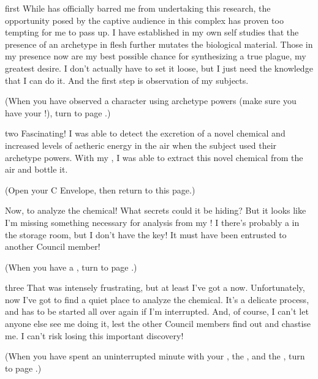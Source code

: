 \documentclass[notebook]{Silversiders} %
\begin{document}
\startnotebook{\nPlagueResearch{}}

\begin{page}{first}
While \cDeath{} has officially barred me from undertaking this research, the opportunity posed by the captive audience in this complex has proven too tempting for me to pass up. I have established in my own self studies that the presence of an archetype in flesh further mutates the biological material. Those in my presence now are my best possible chance for synthesizing a true plague, my greatest desire. I don't actually have to set it loose, but I just need the knowledge that I can do it. And the first step is observation of my subjects.

(When you have observed a character using archetype powers (make sure you have your \iBioKit{}!), turn to page .)
\end{page}

\begin{page}{two}
Fascinating! I was able to detect the excretion of a novel chemical and increased levels of aetheric energy in the air when the subject used their archetype powers. With my \iBioKit{}, I was able to extract this novel chemical from the air and bottle it.

(Open your C Envelope, then return to this page.)

Now, to analyze the chemical! What secrets could it be hiding? But it looks like I'm missing something necessary for analysis from my \iBioKit{}! I there's probably a \iDiffusionMagnifier{} in the storage room, but I don't have the key! It must have been entrusted to another Council member!

(When you have a \iDiffusionMagnifier{}, turn to page .)
\end{page}

\begin{page}{three}
That was intensely frustrating, but at least I've got a \iDiffusionMagnifier{} now. Unfortunately, now I've got to find a quiet place to analyze the chemical. It's a delicate process, and has to be started all over again if I'm interrupted. And, of course, I can't let anyone else see me doing it, lest the other Council members find out and chastise me. I can't risk losing this important discovery!

(When you have spent an uninterrupted minute with your \iBioKit{}, the \iDiffusionMagnifier{}, and the \iMysteryChemical{}, turn to page .)
\end{page}
\end{document}
